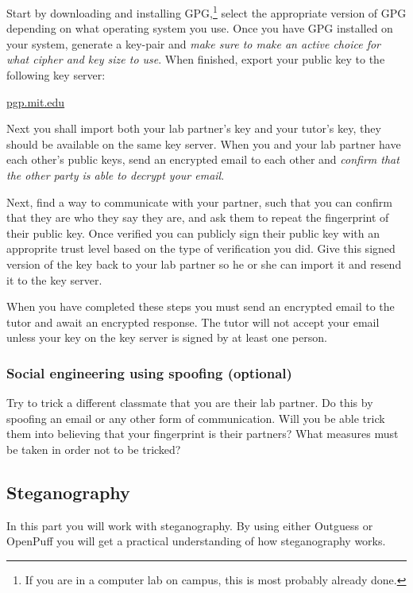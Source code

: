 \documentclass[a4paper,nocourse]{miunasgn}
\begin{document}
Start by downloading and installing GPG,\footnote{%
  If you are in a computer lab on campus, this is most probably already done.
} select the appropriate version of GPG depending on what operating system you 
use.
Once you have GPG installed on your system, generate a key-pair and \emph{make 
sure to make an active choice for what cipher and key size to use}.
When finished, export your public key to the following key server:
\begin{center}
  \url{pgp.mit.edu}
\end{center}

Next you shall import both your lab partner's key and your tutor's key, they
should be available on the same key server.
When you and your lab partner have each other's public keys, send an encrypted
email to each other and \emph{confirm that the other party is able to decrypt 
your email}.

Next, find a way to communicate with your partner, such that you can
confirm that they are who they say they are, and ask them to repeat the 
fingerprint of their public key.
Once verified you can publicly sign their public key with an approprite trust 
level based on the type of verification you did.
Give this signed version of the key back to your lab partner so he or she can 
import it and resend it to the key server.

When you have completed these steps you must send an encrypted email to the 
tutor and await an encrypted response.
The tutor will not accept your email unless your key on the key server is 
signed by at least one person.

\subsubsection{Social engineering using spoofing (optional)}
\label{subsec:Social}
Try to trick a different classmate that you are their lab partner.
Do this by spoofing an email or any other form of communication.
Will you be able trick them into believing that your fingerprint is their 
partners?
What measures must be taken in order not to be tricked?

\subsection{Steganography}
\label{subsec:Steganograhy}
In this part you will work with steganography.
By using either Outguess or OpenPuff you will get a practical understanding of 
how steganography works. 
\end{document}

